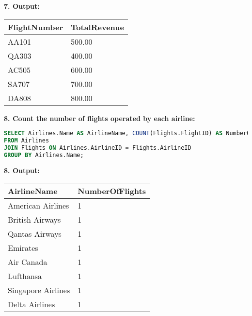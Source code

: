 \documentclass[14pt,a4paper]{extarticle}
\begin{document}
    \textbf{7. Output:}
\begin{table}[h!]
\centering
\begin{tabular}{|l|l|}
\hline
\textbf{FlightNumber} & \textbf{TotalRevenue} \\ \hline
AA101                 & 500.00                \\ \hline
QA303                 & 400.00                \\ \hline
AC505                 & 600.00                \\ \hline
SA707                 & 700.00                \\ \hline
DA808                 & 800.00                \\ \hline
\end{tabular}
\end{table}

    \textbf{8. Count the number of flights operated by each airline:}
    \begin{lstlisting}[language=SQL, upquote=true]
SELECT Airlines.Name AS AirlineName, COUNT(Flights.FlightID) AS NumberOfFlights
FROM Airlines
JOIN Flights ON Airlines.AirlineID = Flights.AirlineID
GROUP BY Airlines.Name;
    \end{lstlisting}
    
    \textbf{8. Output:}
\begin{table}[h!]
\centering
\begin{tabular}{|l|l|}
\hline
\textbf{AirlineName}      & \textbf{NumberOfFlights} \\ \hline
American Airlines         & 1                       \\ \hline
British Airways           & 1                       \\ \hline
Qantas Airways            & 1                       \\ \hline
Emirates                  & 1                       \\ \hline
Air Canada                & 1                       \\ \hline
Lufthansa                 & 1                       \\ \hline
Singapore Airlines        & 1                       \\ \hline
Delta Airlines            & 1                       \\ \hline
\end{tabular}
\end{table}

\newpage
\end{document}
